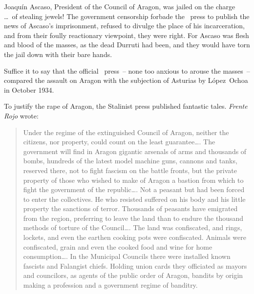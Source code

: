 Joaqu\'in Ascaso, President of the Council of Aragon, was jailed on the charge \dots\ of stealing jewels! The government censorship forbade the \CNT\ press to publish the news of Ascaso’s imprisonment, refused to divulge the place of his incarceration, and from their foully reactionary viewpoint, they were right. For Ascaso was flesh and blood of the masses, as the dead Durruti had been, and they would have torn the jail down with their bare hands.

Suffice it to say that the official \CNT\ press~-- none too anxious to arouse the masses~-- compared the assault on Aragon with the subjection of Asturias by L\'opez~Ochoa in October 1934.

\medskip

To justify the rape of Aragon, the Stalinist press published fantastic tales. \emph{Frente Rojo} wrote:
\begin{quotation}
  Under the regime of the extinguished Council of Aragon, neither the citizens, nor property, could count on the least guarantee\dots.
  The government will find in Aragon gigantic arsenals of arms and thousands of bombs, hundreds of the latest model machine guns, cannons and tanks, reserved there, not to fight fascism on the battle fronts, but the private property of those who wished to make of Aragon a bastion from which to fight the government of the republic\dots.
  Not a peasant but had been forced to enter the collectives. He who resisted suffered on his body and his little property the sanctions of terror. Thousands of peasants have emigrated from the region, preferring to leave the land than to endure the thousand methods of torture of the Council\dots.
  The land was confiscated, and rings, lockets, and even the earthen cooking pots were confiscated. Animals were confiscated, grain and even the cooked food and wine for home consumption\dots.
  In the Municipal Councils there were installed known fascists and Falangist chiefs. Holding union cards they officiated as mayors and councilors, as agents of the public order of Aragon, bandits by origin making a profession and a government regime of banditry.
\end{quotation}

